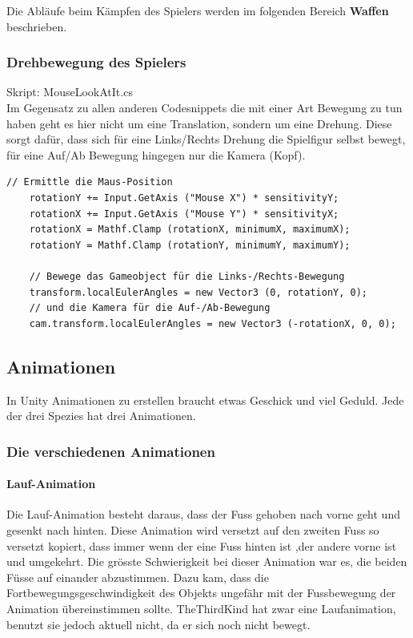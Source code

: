 Die Abläufe beim Kämpfen des Spielers werden im folgenden Bereich \textbf{Waffen} beschrieben.

\subsubsection{Drehbewegung des Spielers}
Skript: MouseLookAtIt.cs\\

Im Gegensatz zu allen anderen Codesnippets die mit einer Art Bewegung zu tun haben geht es hier nicht um eine Translation, sondern um eine Drehung.
Diese sorgt dafür, dass sich für eine Links/Rechts Drehung die Spielfigur selbst bewegt, für eine Auf/Ab Bewegung hingegen nur die Kamera (Kopf).

\begin{lstlisting}[caption={Drehbewegungen}]
	// Ermittle die Maus-Position
	rotationY += Input.GetAxis ("Mouse X") * sensitivityY;
	rotationX += Input.GetAxis ("Mouse Y") * sensitivityX;
	rotationX = Mathf.Clamp (rotationX, minimumX, maximumX);
	rotationY = Mathf.Clamp (rotationY, minimumY, maximumY);
	
	// Bewege das Gameobject für die Links-/Rechts-Bewegung
	transform.localEulerAngles = new Vector3 (0, rotationY, 0);
	// und die Kamera für die Auf-/Ab-Bewegung
	cam.transform.localEulerAngles = new Vector3 (-rotationX, 0, 0);
\end{lstlisting}

\subsection{Animationen}
In Unity Animationen zu erstellen braucht etwas Geschick und viel Geduld. Jede der drei Spezies hat drei Animationen.

\subsubsection{Die verschiedenen Animationen}
\paragraph{Lauf-Animation}

Die Lauf-Animation besteht daraus, dass der Fuss gehoben nach vorne geht und gesenkt nach hinten. Diese Animation wird versetzt auf den zweiten Fuss so versetzt kopiert, dass immer wenn der eine Fuss hinten ist ,der andere vorne ist und umgekehrt. Die grösste Schwierigkeit bei dieser Animation war es, die beiden Füsse auf einander abzustimmen. Dazu kam, dass die Fortbewegungsgeschwindigkeit des Objekts ungefähr mit der Fussbewegung der Animation übereinstimmen sollte. TheThirdKind hat zwar eine Laufanimation, benutzt sie jedoch aktuell nicht, da er sich noch nicht bewegt.

